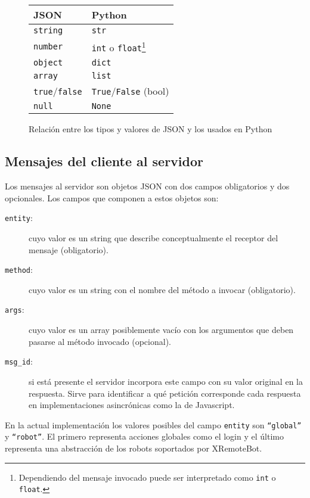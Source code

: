 \begin{figure}
    \centering
    \begin{tabu}{l|l}
        JSON & Python \\
        \hline
        \texttt{string} & \texttt{str} \\
        \texttt{number} & \texttt{int} o \texttt{float}\footnote{Dependiendo
        del mensaje invocado
        puede ser interpretado como \texttt{int} o \texttt{float}.}\\
        \texttt{object} & \texttt{dict} \\
        \texttt{array}  & \texttt{list} \\
        \texttt{true}/\texttt{false} & \texttt{True}/\texttt{False} (bool) \\
        \texttt{null} & \texttt{None} \\
    \end{tabu}
    \caption{Relación entre los tipos y valores de JSON y los usados en
    Python}
    \label{tbl:rel_json_python}
\end{figure}

\subsection{Mensajes del cliente al servidor}

Los mensajes al servidor son objetos JSON con dos campos obligatorios y dos
opcionales. Los campos que componen a estos objetos  son:

\begin{description}
    \item[\texttt{entity}:] cuyo valor es un string que describe conceptualmente
        el receptor del mensaje (obligatorio).
    \item[\texttt{method}:] cuyo valor es un string con el nombre del método a
        invocar (obligatorio).
    \item[\texttt{args}:] cuyo valor es un array posiblemente vacío con los
        argumentos que deben pasarse al método invocado (opcional).
    \item[\texttt{msg\_id}:] si está presente el servidor incorpora este
        campo con su valor original en la respuesta. Sirve para identificar a
        qué petición
        corresponde cada respuesta en implementaciones asincrónicas
        como la de Javascript.
\end{description}

En la actual implementación los valores posibles del campo \texttt{entity} son
\texttt{``global''} y \texttt{``robot''}. El primero
representa acciones globales como el login y el último representa una
abstracción de los robots soportados por XRemoteBot.

